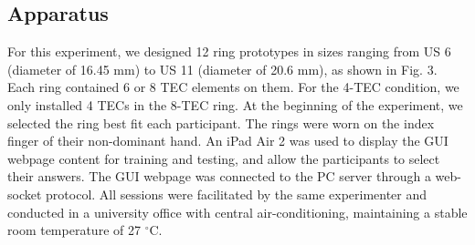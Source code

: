 \documentclass[preprint,12pt]{elsarticle}
\begin{document}
\subsection{Apparatus}
For this experiment, we designed 12 ring prototypes in sizes ranging from US 6 (diameter of 16.45 mm) to US 11 (diameter of 20.6 mm), as shown in Fig. 3. Each ring contained 6 or 8 TEC elements on them. For the 4-TEC condition, we only installed 4 TECs in the 8-TEC ring. At the beginning of the experiment, we selected the ring best fit each participant. The rings were worn on the index finger of their non-dominant hand. An iPad Air 2 was used to display the GUI webpage content for training and testing, and allow the participants to select their answers. The GUI webpage was connected to the PC server through a web-socket protocol. All sessions were facilitated by the same experimenter and conducted in a university office with central air-conditioning, maintaining a stable room temperature of 27 $^{\circ}$C.
\end{document}
